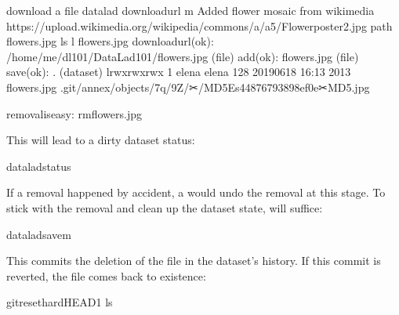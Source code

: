 \begin{sphinxVerbatim}[commandchars=\\\{\}]
\PYGZsh{} download a file
\PYGZdl{} datalad download\PYGZhy{}url \PYGZhy{}m \PYGZdq{}Added flower mosaic from wikimedia\PYGZdq{} \PYGZbs{}
  https://upload.wikimedia.org/wikipedia/commons/a/a5/Flower\PYGZus{}poster\PYGZus{}2.jpg \PYGZbs{}
  \PYGZhy{}\PYGZhy{}path flowers.jpg
\PYGZdl{} ls \PYGZhy{}l flowers.jpg
download\PYGZus{}url(ok): /home/me/dl\PYGZhy{}101/DataLad\PYGZhy{}101/flowers.jpg (file)
add(ok): flowers.jpg (file)
save(ok): . (dataset)
lrwxrwxrwx 1 elena elena 128 2019\PYGZhy{}06\PYGZhy{}18 16:13  2013 flowers.jpg \PYGZhy{}\PYGZgt{} .git/annex/objects/7q/9Z/✂/MD5E\PYGZhy{}s4487679\PYGZhy{}\PYGZhy{}3898ef0e✂MD5.jpg
\end{sphinxVerbatim}

\begin{sphinxVerbatim}[commandchars=\\\{\}]
removaliseasy:
rmflowers.jpg
\end{sphinxVerbatim}

\sphinxAtStartPar
This will lead to a dirty dataset status:

\begin{sphinxVerbatim}[commandchars=\\\{\}]
dataladstatus
\end{sphinxVerbatim}

\sphinxAtStartPar
If a removal happened by accident, a  would undo
the removal at this stage. To stick with the removal and clean up the dataset
state,  will suffice:

\begin{sphinxVerbatim}[commandchars=\\\{\}]
dataladsave\PYGZhy{}m
\end{sphinxVerbatim}

\sphinxAtStartPar
This commits the deletion of the file in the dataset’s history.
If this commit is reverted, the file comes back to existence:

%
\begin{sphinxVerbatim}[commandchars=\\\{\}]
gitreset\PYGZhy{}\PYGZhy{}hardHEAD\PYGZti{}1
ls
\end{sphinxVerbatim}
\sphinxresetverbatimhllines

